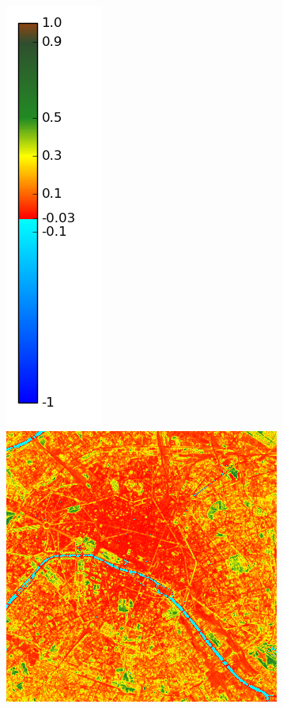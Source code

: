 \documentclass{book}
\begin{document}
\begin{figure}[H]
{\includegraphics[scale=0.2]{images/colormap.png}
\includegraphics[scale=0.25]{images/Paris/05_ndvi.png}
}
\end{figure}
\end{document}
